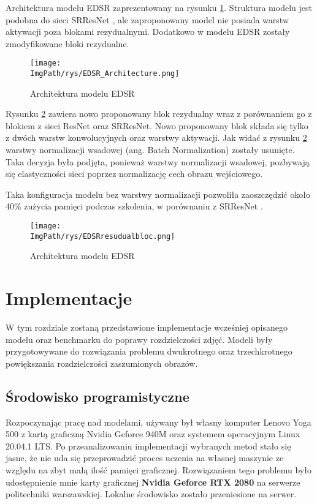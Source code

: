 \documentclass[a4paper,12pt,twoside,openany]{report}
\newcommand{\ImgPath}{.}
\begin{document}
	Architektura modelu EDSR zaprezentowany na  rysunku \ref{EDSR}. Struktura modelu jest podobna do sieci SRResNet \cite{SRResNet}, ale zaproponowany model nie posiada warstw aktywacji poza blokami rezydualnymi. Dodatkowo w modelu EDSR zostały  zmodyfikowane bloki rezydualne. 
	
		\begin{figure}[!htbp]
		\begin{center}
			\centering
			\texttt{[image: \\ImgPath/rys/EDSR\_Architecture.png]}
		\end{center}
		\caption{Architektura modelu EDSR}
		\label{EDSR}
	\end{figure} 
	\newpage
	Rysunku \ref{EDSR_resBlok} zawiera nowo proponowany blok rezydualny wraz z porównaniem go z blokiem z sieci ResNet oraz SRResNet. Nowo proponowany blok składa się tylko z dwóch warstw konwolucyjnych oraz warstwy aktywacji. Jak widać z rysunku \ref{EDSR_resBlok} warstwy normalizacji wsadowej (ang. Batch Normalization) zostały usunięte. Taka decyzja była podjęta, ponieważ warstwy normalizacji wsadowej, pozbywają się elastyczności sieci poprzez normalizację cech obrazu wejściowego.
	
	Taka konfiguracja modelu bez warstwy normalizacji pozwoliła zaoszczędzić około 40\% zużycia pamięci podczas szkolenia, w porównaniu z SRResNet \cite{SRResNet}.
	\begin{figure}[!htbp]
		\begin{center}
			\centering
			\texttt{[image: \\ImgPath/rys/EDSRresudualbloc.png]}
		\end{center}
		\caption{Architektura modelu EDSR}
		\label{EDSR_resBlok}
	\end{figure}

\chapter{Implementacje}
	W tym rozdziale zostaną przedstawione implementacje wcześniej opisanego modelu oraz benchmarku do poprawy rozdzielczości zdjęć. Modeli były przygotowywane do rozwiązania problemu dwukrotnego oraz trzechkrotnego powiększania rozdzielczości zaszumionych obrazów.

\section{Środowisko programistyczne}
	Rozpoczynając pracę nad modelami, używany był własny komputer Lenovo Yoga 500 z kartą graficzną Nvidia Geforce 940M oraz systemem operacyjnym Linux 20.04.1 LTS. Po przeanalizowaniu implementacji wybranych metod stało się jasne, że nie uda się przeprowadzić proces uczenia na własnej maszynie ze względu na zbyt małą ilość pamięci graficznej. Rozwiązaniem tego problemu było udostępnienie mnie karty graficznej \textbf{Nvidia Geforce RTX 2080} na serwerze politechniki warszawskiej. Lokalne środowisko zostało przeniesione  na serwer.
\end{document}
